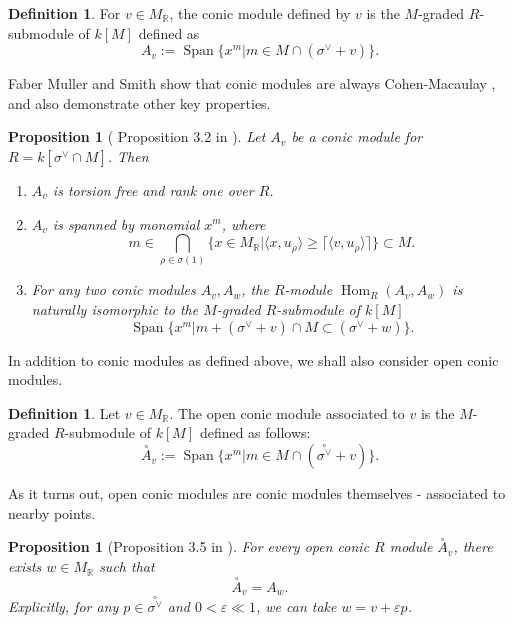 \documentclass[reqno, 12pt]{amsart}
\newtheorem{proposition}[theorem]{Proposition}
\theoremstyle{definition}
\newtheorem{definition}[theorem]{Definition}
\numberwithin{equation}{section}
\newcommand{\newterm}{\textsf}
\newcommand{\Hom}{\operatorname{Hom}}
\newcommand{\R}{\mathbb{R}}
\newcommand{\opA}{\overset{\circ}{A}}
\begin{document}
\begin{definition}
    \label{Def:ConicModule}
    For $v\in M_{\R}$, the \newterm{conic module defined by} $v$ is the $M$-graded $R$-submodule of $k[M]$ defined as
    \[
    A_v:=\operatorname{Span}\{x^m\vert m\in M\cap (\sigma^\vee+v)\}.
    \]
\end{definition}
Faber Muller and Smith show that conic modules are always Cohen-Macaulay \cite[Corollary 4.16]{FMS19}, and also demonstrate other key properties.
\begin{proposition}[ Proposition 3.2 in \cite{FMS19}]
    \label{Prop:ConicModulesProperties}
    Let $A_v$ be a conic module for $R=k[\sigma^\vee\cap M]$. Then
    \begin{enumerate}
        \item $A_v$ is torsion free and rank one over $R$.
        \item $A_v$ is spanned by monomial $x^m$, where \[
        m\in \bigcap_{\rho\in\sigma(1)}\{x\in M_\R\vert \langle x,u_\rho\rangle \geq \lceil\langle v,u_\rho\rangle\rceil\}\subset M.
        \]
        \item For any two conic modules $A_v, A_w$, the $R$-module $\Hom_R(A_v,A_w)$ is naturally isomorphic to the $M$-graded $R$-submodule of $k[M]$\[
        \operatorname{Span}\{x^m\vert m+(\sigma^\vee+v)\cap M\subset (\sigma^\vee+w)\}.
        \]
    \end{enumerate}
\end{proposition}
\noindent In addition to conic modules as defined above, we shall also consider \newterm{open conic modules}.
\begin{definition}
    \label{Def:OpenConicModule}
Let $v\in M_\R$. The \newterm{open conic module} associated to $v$ is the $M$-graded $R$-submodule of $k[M]$ defined as follows:
\[
\opA_v:=\operatorname{Span}\{x^m\vert m\in M\cap (\overset{\circ}{\sigma^\vee}+v)\}.
\]
\end{definition}

\noindent As it turns out, open conic modules are conic modules themselves -  associated to nearby points.
\begin{proposition}[Proposition 3.5 in \cite{FMS19}]
    \label{Prop:OpenconicIsNearby}
    For every open conic $R$ module $\opA_v$, there exists $w\in M_\R$ such that \[
    \opA_v=A_w.
    \]
    Explicitly, for any $p\in \overset{\circ}{\sigma^\vee}$ and $0<\varepsilon\ll1$, we can take $w=v+\varepsilon p$.
\end{proposition}
\end{document}
